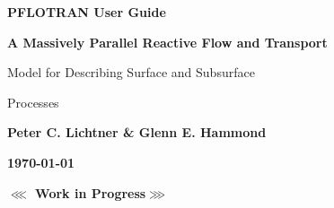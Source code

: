 \begin{center}

\dblline

\vspace{1 cm}

{\bf\huge PFLOTRAN User Guide}

\vspace{1cm}

{\bf\LARGE A Massively Parallel Reactive Flow and Transport 

Model for Describing Surface and Subsurface 

Processes}

\vspace{3cm}

{\bf\large Peter C. Lichtner \& Glenn E. Hammond}

\vspace{3cm}

{\bf\large\today}

\end{center}

\dblline


\vspace{3cm}

\begin{center}
{\bf\LARGE $\lll$ Work in Progress$\ggg$}
\end{center}